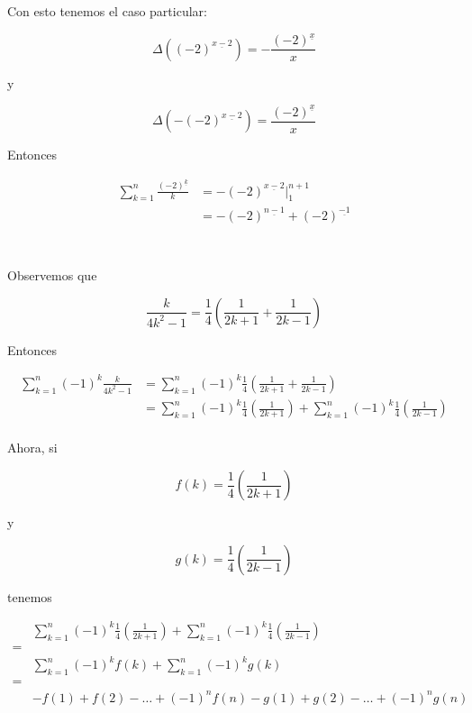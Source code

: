 \documentclass{article}
\begin{document}
Con esto tenemos el caso particular:

$$
\Delta((-2)^{\underline{x-2}}) = -\frac{(-2)^{\underline{x}}}{x}
$$

y

$$
\Delta(-(-2)^{\underline{x-2}}) = \frac{(-2)^{\underline{x}}}{x}
$$

Entonces

\begin{align*}
\sum_{k=1}^n \frac{(-2)^{\underline{k}}}{k} & = -(-2)^{\underline{x-2}} \Big |_{1}^{n+1} \\
  & = - (-2)^{\underline{n-1}} + (-2)^{\underline{-1}} \\
\end{align*}

\section{} %

Observemos que

$$
\frac{k}{4k^2-1} = \frac{1}{4} \left( \frac{1}{2k+1} + \frac{1}{2k-1} \right)
$$

Entonces

\begin{align*}
\sum_{k=1}^n (-1)^k \frac{k}{4k^2-1} & = \sum_{k=1}^n (-1)^k \frac{1}{4} \left( \frac{1}{2k+1} + \frac{1}{2k-1} \right) \\
  & = \sum_{k=1}^n (-1)^k \frac{1}{4} \left( \frac{1}{2k+1} \right) + \sum_{k=1}^n (-1)^k \frac{1}{4} \left( \frac{1}{2k-1} \right) \\
\end{align*}

Ahora, si

$$
f(k) = \frac{1}{4} \left( \frac{1}{2k+1} \right)
$$

y

$$
g(k) = \frac{1}{4} \left( \frac{1}{2k-1} \right)
$$

tenemos

\begin{align*}
 & \sum_{k=1}^n (-1)^k \frac{1}{4} \left( \frac{1}{2k+1} \right) + \sum_{k=1}^n (-1)^k \frac{1}{4} \left( \frac{1}{2k-1} \right) \\
 = & \\
 & \sum_{k=1}^n (-1)^k f(k) + \sum_{k=1}^n (-1)^k g(k) \\
 = & \\
 & -f(1)+f(2)-\ldots+(-1)^n f(n)-g(1)+g(2)-\ldots+(-1)^n g(n) \\
\end{align*}
\end{document}
